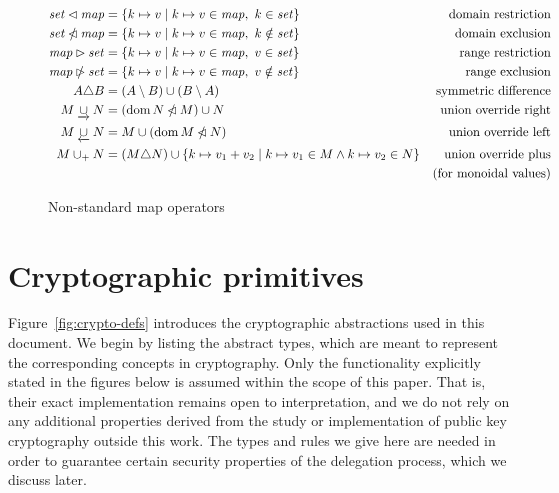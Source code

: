 \documentclass[11pt,a4paper,dvipsnames]{article}
\theoremstyle{definition}
\theoremstyle{definition}
\begin{document}
\begin{figure}
  \begin{align*}
    \mathit{set} \lhd \mathit{map}
    & = \{ k \mapsto v \mid k \mapsto v \in \mathit{map}, ~ k \in \mathit{set} \}
    & \text{domain restriction}
    \\
    \mathit{set} \mathbin{\slashed{\lhd}} \mathit{map}
    & = \{ k \mapsto v \mid k \mapsto v \in \mathit{map}, ~ k \notin \mathit{set} \}
    & \text{domain exclusion}
    \\
    \mathit{map} \rhd \mathit{set}
    & = \{ k \mapsto v \mid k \mapsto v \in \mathit{map}, ~ v \in \mathit{set} \}
    & \text{range restriction}
    \\
    \mathit{map} \mathbin{\slashed{\rhd}} \mathit{set}
    & = \{ k \mapsto v \mid k \mapsto v \in \mathit{map}, ~ v \notin \mathit{set} \}
    & \text{range exclusion}
    \\
    A \triangle B
    & = (A \setminus B) \cup (B \setminus A)
    & \text{symmetric difference}
    \\
    M \mathbin{\underrightarrow\cup} N
    & = (\operatorname{dom} N \mathbin{\slashed{\lhd}} M)\cup N
    & \text{union override right}
    \\
    M \mathbin{\underleftarrow\cup} N
    & = M \cup (\operatorname{dom} M \mathbin{\slashed{\lhd}} N)
    & \text{union override left}
    \\
    M \mathbin{\cup_{+}} N
    & = (M \triangle N)
    \cup \{k\mapsto v_1+v_2\mid {k\mapsto v_1}\in M \land {k\mapsto v_2}\in N \}
    & \text{union override plus} \\
    & & \text{(for monoidal values)}\\
  \end{align*}
  \caption{Non-standard map operators}
  \label{fig:notation:nonstandard}
\end{figure}

\clearpage

\section{Cryptographic primitives}
\label{sec:crypto-primitives}


Figure~\ref{fig:crypto-defs} introduces the cryptographic abstractions used in
this document. We begin by listing the abstract types, which are meant to
represent the corresponding concepts in cryptography. Only the functionality
explicitly stated in the figures below is assumed within the scope of this paper.
That is, their exact
implementation remains open to interpretation, and we do not rely on
any additional properties derived from the study or implementation of public key
cryptography outside this work. The types and rules we give here are needed in
order to guarantee certain security properties of the delegation process, which
we discuss later.
\end{document}
